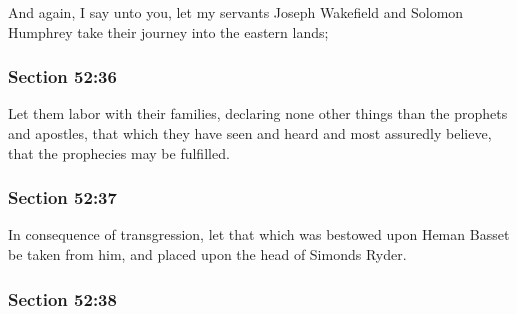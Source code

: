 		And again, I say unto you, let my servants Joseph Wakefield and Solomon Humphrey take their journey into the eastern lands;


	\subsubsection{Section 52:36} %
		\label{DC52-36}

		Let them labor with their families, declaring none other things than the prophets and apostles, that which they have seen and heard and most assuredly believe, that the prophecies may be fulfilled.


	\subsubsection{Section 52:37} %
		\label{DC52-37}

		In consequence of transgression, let that which was bestowed upon Heman Basset be taken from him, and placed upon the head of Simonds Ryder.


	\subsubsection{Section 52:38} %
		\label{DC52-38}

